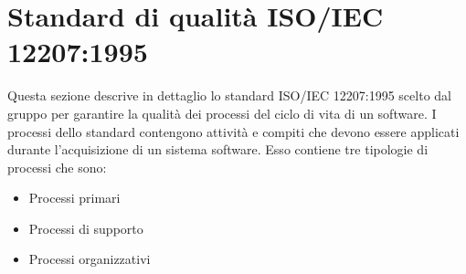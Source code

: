 \section{Standard di qualità ISO/IEC 12207:1995}
Questa sezione descrive in dettaglio lo standard ISO/IEC 12207:1995 scelto dal gruppo per garantire la qualità dei processi del ciclo di vita di un software. I processi dello standard contengono attività e compiti che devono essere applicati durante l'acquisizione di un sistema software. Esso contiene tre tipologie di processi che sono: 
\begin{itemize}
\item Processi primari
\item Processi di supporto
\item Processi organizzativi
\end{itemize}


